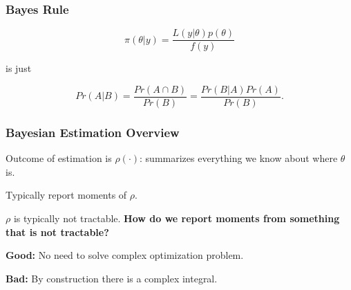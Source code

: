 \documentclass[11pt, aspectratio=169]{beamer}
\newenvironment{wideitemize}{\itemize\addtolength{\itemsep}{10pt}}{\enditemize}
\begin{document}
\begin{frame}[c]\frametitle{Bayes Rule}
    
$$\pi(\theta | y) = \frac{L(y | \theta) p(\theta)}{f(y)}$$ 

is just

$$Pr(A | B) = \frac{Pr(A \cap B)}{Pr(B)} = \frac{Pr(B|A) Pr(A)}{Pr(B)}.$$

\end{frame}


\begin{frame}[c]\frametitle{Bayesian Estimation Overview}
    
\begin{wideitemize}
    \item Outcome of estimation is $\rho(\cdot)$: summarizes everything we know about where $\theta$ is.
    \item Typically report moments of $\rho$.
    \item $\rho$ is typically not tractable. \textbf{How do we report moments from something that is not tractable?} 
\end{wideitemize}    

\vspace{1em}
\textbf{Good:} No need to solve complex optimization problem.

\vspace{1em}
\textbf{Bad:} By construction there is a complex integral.

\end{frame}
\end{document}
